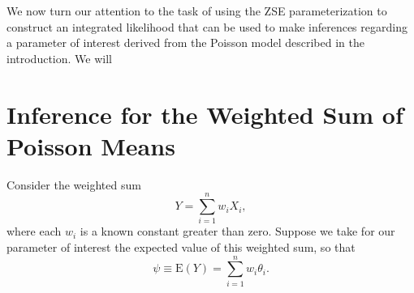 \documentclass[
  12pt]{article}
\begin{document}
We now turn our attention to the task of using the ZSE parameterization
to construct an integrated likelihood that can be used to make
inferences regarding a parameter of interest derived from the Poisson
model described in the introduction. We will

\section{Inference for the Weighted Sum of Poisson
Means}\label{inference-for-the-weighted-sum-of-poisson-means}

Consider the weighted sum \[Y = \sum_{i=1}^n w_iX_i,\] where each
\(w_i\) is a known constant greater than zero. Suppose we take for our
parameter of interest the expected value of this weighted sum, so that
\[\psi \equiv \text{E}(Y) = \sum_{i=1}^n w_i\theta_i.\]


\renewcommand\refname{Examples}
  
\end{document}
